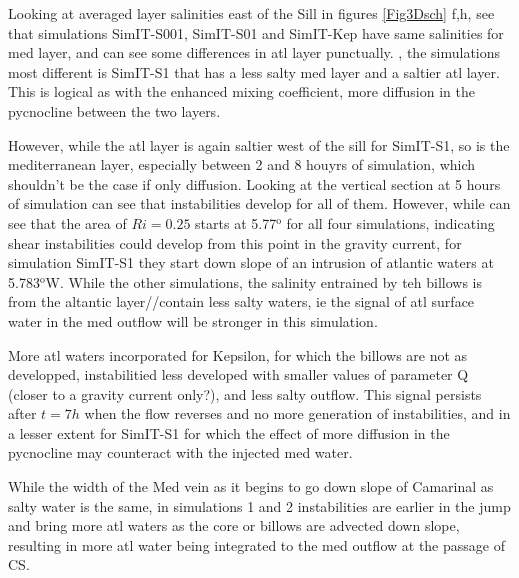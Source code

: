 Looking at averaged layer salinities east of the Sill in figures \ref{Fig3Dsch} f,h, see that simulations SimIT-S001, SimIT-S01 and SimIT-Kep have same salinities for med layer, and can see some differences in atl layer punctually. , the simulations most different is SimIT-S1 that has a less salty med layer and a saltier atl layer. This is logical as with the enhanced mixing coefficient, more diffusion in the pycnocline between the two layers.

However, while the atl layer is again saltier west of the sill for SimIT-S1, so is the mediterranean layer, especially between 2 and 8 houyrs of simulation, which shouldn't be the case if only diffusion. Looking at the vertical section at 5 hours of simulation can see that instabilities develop for all of them. However, while can see that the area of $Ri=0.25$ starts at 5.77$^\text{o}$ for all four simulations, indicating shear instabilities could develop from this point in the gravity current, for simulation SimIT-S1 they start down slope of an intrusion of atlantic waters at 5.783$^\text{o}$W. While the other simulations, the salinity entrained by teh billows is from the altantic layer//contain less salty waters, ie the signal of atl surface water in the med outflow will be stronger in this simulation.

More atl waters incorporated for Kepsilon, for which the billows are not as developped, instabilitied less developed with smaller values of parameter Q (closer to a gravity current only?), and less salty outflow. This signal persists after $t=7h$ when the flow reverses and no more generation of instabilities, and in a lesser extent for SimIT-S1 for which the effect of more diffusion in the pycnocline may counteract with the injected med water.


While the width of the Med vein as it begins to go down slope of Camarinal as salty water is the same, in simulations 1 and 2 instabilities are earlier in the jump and bring more atl waters as the core or billows are advected down slope, resulting in more atl water being integrated to the med outflow at the passage of CS. 






